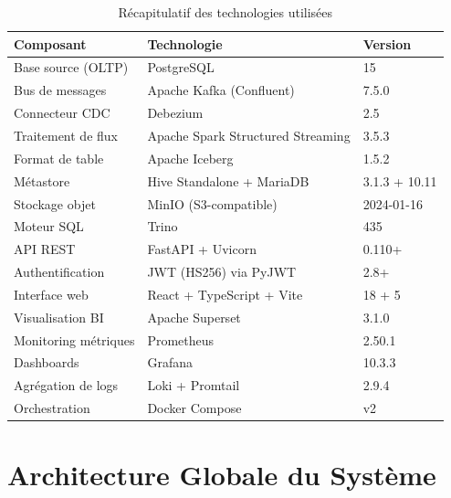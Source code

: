 \documentclass[12pt,a4paper]{report}
\begin{document}
\begin{table}[h]
\centering
\caption{Récapitulatif des technologies utilisées}
\label{tab:stack}
\renewcommand{\arraystretch}{1.3}
\begin{tabular}{lll}
\toprule
\textbf{Composant}     & \textbf{Technologie}         & \textbf{Version} \\
\midrule
Base source (OLTP)     & PostgreSQL                   & 15               \\
Bus de messages        & Apache Kafka (Confluent)     & 7.5.0            \\
Connecteur CDC         & Debezium                     & 2.5              \\
Traitement de flux     & Apache Spark Structured Streaming & 3.5.3       \\
Format de table        & Apache Iceberg               & 1.5.2            \\
Métastore              & Hive Standalone + MariaDB    & 3.1.3 + 10.11   \\
Stockage objet         & MinIO (S3-compatible)        & 2024-01-16       \\
Moteur SQL             & Trino                        & 435              \\
API REST               & FastAPI + Uvicorn            & 0.110+           \\
Authentification       & JWT (HS256) via PyJWT        & 2.8+             \\
Interface web          & React + TypeScript + Vite    & 18 + 5           \\
Visualisation BI       & Apache Superset              & 3.1.0            \\
Monitoring métriques   & Prometheus                   & 2.50.1           \\
Dashboards             & Grafana                      & 10.3.3           \\
Agrégation de logs     & Loki + Promtail              & 2.9.4            \\
Orchestration          & Docker Compose               & v2               \\
\bottomrule
\end{tabular}
\end{table}

\chapter{Architecture Globale du Système}
\end{document}
